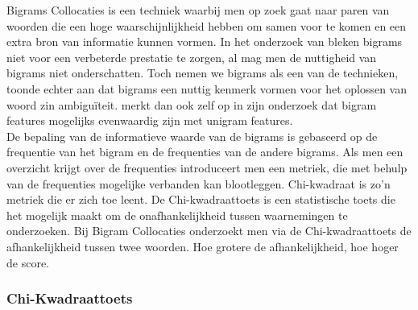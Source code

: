 Bigrams Collocaties is een techniek waarbij men op zoek gaat naar paren van woorden die een hoge waarschijnlijkheid hebben om samen voor te komen en een extra bron van informatie kunnen vormen. In het onderzoek van \cite{pang2002thumbs} bleken bigrams niet voor een verbeterde prestatie te zorgen, al mag men de nuttigheid van bigrams niet onderschatten. Toch nemen we bigrams als een van de technieken,\cite{edersen2001decision} toonde echter aan dat bigrams een nuttig kenmerk vormen voor het oplossen van woord zin ambiguïteit. \cite{pang2002thumbs} merkt dan ook zelf op in zijn onderzoek dat bigram features mogelijks evenwaardig zijn met unigram features.\\
%
De bepaling van de informatieve waarde van de bigrams is gebaseerd op de frequentie van het bigram en de frequenties van de andere bigrams. Als men een overzicht krijgt over de frequenties introduceert men een metriek, die met behulp van de frequenties mogelijke verbanden kan blootleggen. Chi-kwadraat is zo'n metriek die er zich toe leent. De Chi-kwadraattoets is een statistische toets die het mogelijk maakt om de onafhankelijkheid tussen waarnemingen te onderzoeken. Bij Bigram Collocaties onderzoekt men via de Chi-kwadraattoets de afhankelijkheid tussen twee woorden. Hoe grotere de afhankelijkheid, hoe hoger de score.   

\subsubsection{Chi-Kwadraattoets}\label{Chi-Kwadraattoest}

